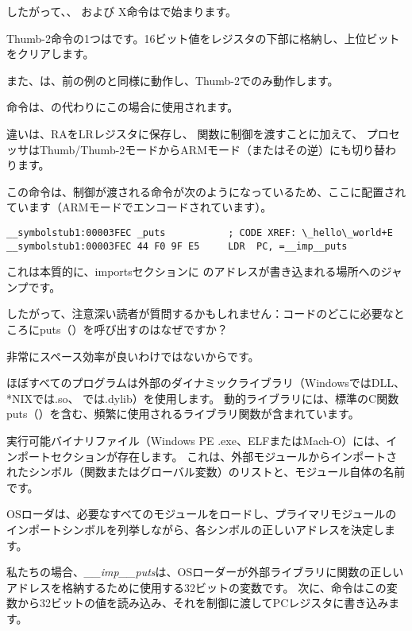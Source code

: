 
したがって、、  および X命令はで始まります。

Thumb-2命令の1つはです。16ビット値をレジスタの下部に格納し、上位ビットをクリアします。

また、は、前の例のと同様に動作し、Thumb-2でのみ動作します。


命令は、の代わりにこの場合に使用されます。

違いは、\ac{RA}を\ac{LR}レジスタに保存し、 \puts 関数に制御を渡すことに加えて、
プロセッサはThumb/Thumb-2モードからARMモード（またはその逆）にも切り替わります。

この命令は、制御が渡される命令が次のようになっているため、ここに配置されています（ARMモードでエンコードされています）。

\begin{lstlisting}[style=customasmARM]
__symbolstub1:00003FEC _puts           ; CODE XREF: \_hello\_world+E
__symbolstub1:00003FEC 44 F0 9F E5     LDR  PC, =__imp__puts
\end{lstlisting}

これは本質的に、importsセクションに \puts のアドレスが書き込まれる場所へのジャンプです。

したがって、注意深い読者が質問するかもしれません：コードのどこに必要なところにputs（）を呼び出すのはなぜですか？

非常にスペース効率が良いわけではないからです。

ほぼすべてのプログラムは外部のダイナミックライブラリ（WindowsではDLL、*NIXでは.so、 \MacOSX では.dylib）を使用します。
動的ライブラリには、標準のC関数puts（）を含む、頻繁に使用されるライブラリ関数が含まれています。

実行可能バイナリファイル（Windows PE .exe、ELFまたはMach-O）には、インポートセクションが存在します。
これは、外部モジュールからインポートされたシンボル（関数またはグローバル変数）のリストと、モジュール自体の名前です。

\ac{OS}ローダは、必要なすべてのモジュールをロードし、プライマリモジュールのインポートシンボルを列挙しながら、各シンボルの正しいアドレスを決定します。

私たちの場合、\emph{\_\_imp\_\_puts}は、\ac{OS}ローダーが外部ライブラリに関数の正しいアドレスを格納するために使用する32ビットの変数です。
次に、命令はこの変数から32ビットの値を読み込み、それを制御に渡して\ac{PC}レジスタに書き込みます。

